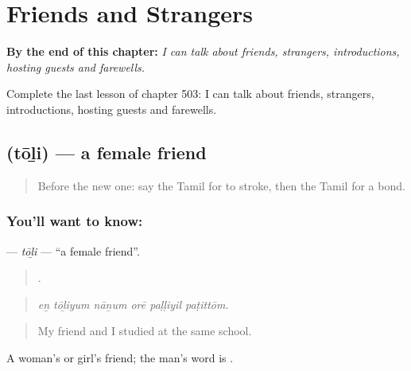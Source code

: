 
\chapter{Friends and Strangers}
\label{ch:ta-friends-and-strangers}

\begin{chapteropening}
\textbf{By the end of this chapter:} \emph{I can talk about friends, strangers, introductions, hosting guests and farewells.}

Complete the last lesson of chapter 503: I can talk about friends, strangers, introductions, hosting guests and farewells.
\end{chapteropening}

\section[\texorpdfstring{\ta{தோழி} (tōḻi)}{தோழி (tōḻi)}]{ (tōḻi) — a female friend}

\label{lesson:TA-C503-toli}



\begin{quote}
Before the new one: say the Tamil for to stroke, then the Tamil for a bond.
\end{quote}

\subsection*{You'll want to know: }
\textbf{} — \emph{tōḻi} — \textquotedblleft{}a female friend\textquotedblright{}.

\begin{quote}
     .
\end{quote}

\begin{quote}
\emph{eṉ tōḻiyum nāṉum orē paḷḷiyil paṭittōm.}
\end{quote}

\begin{quote}
My friend and I studied at the same school.
\end{quote}

A woman’s or girl’s friend; the man’s word is .

